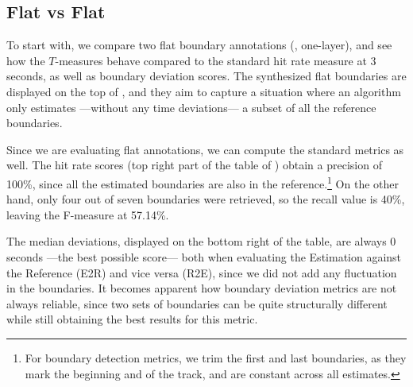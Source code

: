 \documentclass{article}
\begin{document}
\subsection{Flat vs Flat}

To start with, we compare two flat boundary annotations (\ie, one-layer), and see how the $T$-measures behave compared to the standard hit rate measure at 3 seconds, as well as boundary deviation scores.
The synthesized flat boundaries are displayed on the top of , and they aim to capture a situation where an algorithm only estimates ---without any time deviations--- a subset of all the reference boundaries.

Since we are evaluating flat annotations, we can compute the standard metrics as well.
The hit rate scores (top right part of the table of ) obtain a precision of 100\%, since all the estimated boundaries are also in the reference.\footnote{For boundary detection metrics, we trim the first and last boundaries, as they mark the beginning and of the track, and are constant across all estimates.}
On the other hand, only four out of seven boundaries were retrieved, so the recall value is 40\%, leaving the F-measure at 57.14\%.

The median deviations, displayed on the bottom right of the table, are always 0 seconds ---the best possible score--- both when evaluating the Estimation against the Reference (E2R) and vice versa (R2E), since we did not add any fluctuation in the boundaries.
It becomes apparent how boundary deviation metrics are not always reliable, since two sets of boundaries can be quite structurally different while still obtaining the best results for this metric.
\end{document}
